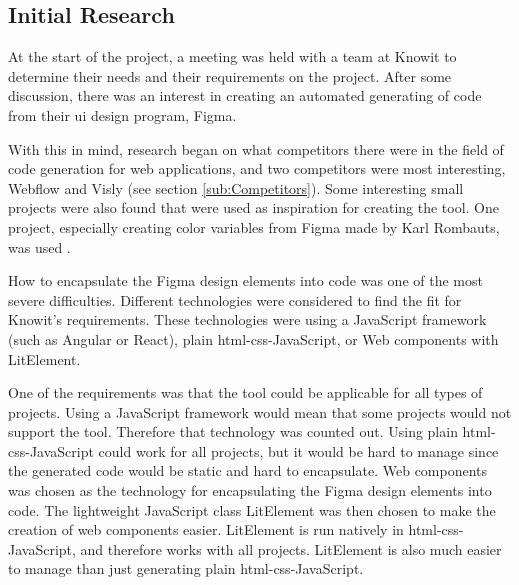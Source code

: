 \subsection{Initial Research}%
\label{sub:Initial Research}

At the start of the project, a meeting was held with a team at Knowit to determine their needs and their requirements on the project. After some discussion, there was an interest in creating an automated generating of code from their \acrshort{ui} design program, Figma. 

With this in mind, research began on what competitors there were in the field of code generation for web applications, and two competitors were most interesting, Webflow and Visly (see section \ref{sub:Competitors}). Some interesting small projects were also found that were used as inspiration for creating the tool. One project, especially creating color variables from Figma made by Karl Rombauts, was used \cite{rombautsKarlRombautsFigmaSCSSGenerator2021}.

How to encapsulate the Figma design elements into code was one of the most severe difficulties.  Different technologies were considered to find the fit for Knowit's requirements.  These technologies were using a JavaScript framework (such as Angular or React), plain \acrshort{html}-\acrshort{css}-JavaScript, or Web \glspl{component} with LitElement. 

One of the requirements was that the tool could be applicable for all types of projects. Using a JavaScript framework would mean that some projects would not support the tool. Therefore that technology was counted out. Using plain \acrshort{html}-\acrshort{css}-JavaScript could work for all projects, but it would be hard to manage since the generated code would be static and hard to encapsulate. Web \glspl{component} was chosen as the technology for encapsulating the Figma design elements into code. The lightweight JavaScript class LitElement was then chosen to make the creation of web components easier. LitElement is run natively in \acrshort{html}-\acrshort{css}-JavaScript, and therefore works with all projects. LitElement is also much easier to manage than just generating plain \acrshort{html}-\acrshort{css}-JavaScript.



